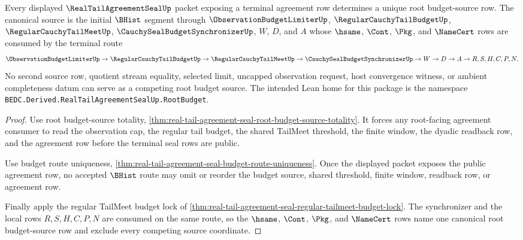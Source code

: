 \begin{theorem}
\label{thm:real-tail-agreement-seal-root-budget-source-canonicality}
Every displayed $\RealTailAgreementSealUp$ packet exposing a terminal agreement row determines a unique root budget-source row. The canonical source is the initial $\BHist$ segment through $\ObservationBudgetLimiterUp$, $\RegularCauchyTailBudgetUp$, $\RegularCauchyTailMeetUp$, $\CauchySealBudgetSynchronizerUp$, $W$, $D$, and $A$ whose $\hsame$, $\Cont$, $\Pkg$, and $\NameCert$ rows are consumed by the terminal route
$$
\ObservationBudgetLimiterUp \to \RegularCauchyTailBudgetUp \to \RegularCauchyTailMeetUp \to \CauchySealBudgetSynchronizerUp \to W \to D \to A \to R,S,H,C,P,N.
$$
No second source row, quotient stream equality, selected limit, uncapped observation request, host convergence witness, or ambient completeness datum can serve as a competing root budget source. The intended Lean home for this package is the namespace \texttt{BEDC.Derived.RealTailAgreementSealUp.RootBudget}.
\end{theorem}
\begin{proof}
Use root budget-source totality, \autoref{thm:real-tail-agreement-seal-root-budget-source-totality}. It forces any root-facing agreement consumer to read the observation cap, the regular tail budget, the shared TailMeet threshold, the finite window, the dyadic readback row, and the agreement row before the terminal seal rows are public.

Use budget route uniqueness, \autoref{thm:real-tail-agreement-seal-budget-route-uniqueness}. Once the displayed packet exposes the public agreement row, no accepted $\BHist$ route may omit or reorder the budget source, shared threshold, finite window, readback row, or agreement row.

Finally apply the regular TailMeet budget lock of \autoref{thm:real-tail-agreement-seal-regular-tailmeet-budget-lock}. The synchronizer and the local rows $R,S,H,C,P,N$ are consumed on the same route, so the $\hsame$, $\Cont$, $\Pkg$, and $\NameCert$ rows name one canonical root budget-source row and exclude every competing source coordinate.
\end{proof}

